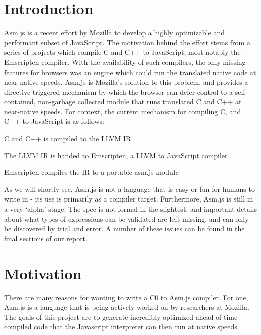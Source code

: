 \documentclass[twoside]{article}
\begin{document}
\begin{multicols}{2} %

\section{Introduction}
Asm.js is a recent effort by Mozilla to develop a highly optimizable and performant
subset of JavaScript. The motivation behind the effort stems from a series of projects which
compile C and C++ to JavaScript, most notably the Emscripten compiler. With the availability of such
compilers, the only missing features for browsers was an engine which could run the
translated native code at near-native speeds. Asm.js is Mozilla's solution to this problem,
and provides a directive triggered mechanism by which the browser can defer control to a
self-contained, non-garbage collected module that runs translated C and C++ at near-native speeds.
For context, the current mechanism for compiling C, and C++ to JavaScript is as follows:

\begin{compactitem}
  \item C and C++ is compiled to the LLVM IR
  \item The LLVM IR is handed to Emscripten, a LLVM to JavaScript compiler
  \item Emscripten compiles the IR to a portable asm.js module
\end{compactitem}

As we will shortly see, Asm.js is not a language that is easy or fun for humans to write in -
its use is primarily as a compiler target. Furthermore, Asm.js is still in a very `alpha' stage. 
The spec is not formal in the slightest, and important details about what types of expressions can
be validated are left missing, and can only be discovered by trial and error. A number of these issues
can be found in the final sections of our report. 

\section{Motivation}

There are many reasons for wanting to write a C0 to Asm.js compiler. For one,
Asm.js is a language that is being actively worked on by researchers at Mozilla.
The goals of this project are to generate incredibly optimized ahead-of-time 
compiled code that the Javascript interpreter can then run at native speeds.


\end{multicols}
\end{document}
